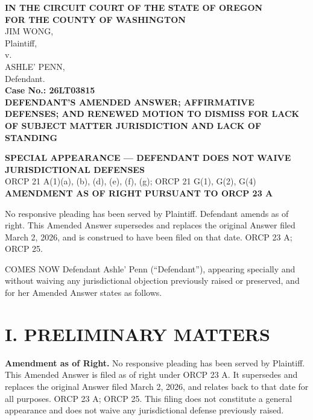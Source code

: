 \documentclass[12pt,letterpaper]{article}
\newcommand{\docshortname}{AMENDED ANSWER}
\newcommand{\oregoncaption}[5]{%
\noindent
\textbf{IN THE CIRCUIT COURT OF THE STATE OF OREGON} \\
\textbf{FOR THE COUNTY OF #1} \\
\vspace{0.2in}
\noindent #2, \\
\quad Plaintiff, \\
v. \\
#3, \\
\quad Defendant. \\
\vspace{0.1in}
\noindent \textbf{Case No.: #4} \\
\vspace{0.1in}
\noindent \textbf{#5} \\
\vspace{0.1in}
}
\begin{document}
\renewcommand{\docshortname}{AMENDED ANSWER}

\oregoncaption{WASHINGTON}{JIM WONG}{ASHLE' PENN}{26LT03815}{DEFENDANT'S AMENDED ANSWER; AFFIRMATIVE DEFENSES; AND RENEWED MOTION TO DISMISS FOR LACK OF SUBJECT MATTER JURISDICTION AND LACK OF STANDING}

\begin{center}
\textbf{SPECIAL APPEARANCE --- DEFENDANT DOES NOT WAIVE JURISDICTIONAL DEFENSES} \\
ORCP 21 A(1)(a), (b), (d), (e), (f), (g); ORCP 21 G(1), G(2), G(4) \\
\textbf{AMENDMENT AS OF RIGHT PURSUANT TO ORCP 23 A}
\end{center}

No responsive pleading has been served by Plaintiff. Defendant amends as of right. This Amended Answer supersedes and replaces the original Answer filed March 2, 2026, and is construed to have been filed on that date. ORCP 23 A; ORCP 25.

COMES NOW Defendant Ashle' Penn (``Defendant''), appearing specially and without waiving any jurisdictional objection previously raised or preserved, and for her Amended Answer states as follows.

\section*{I. PRELIMINARY MATTERS}

\textbf{Amendment as of Right.} No responsive pleading has been served by Plaintiff. This Amended Answer is filed as of right under ORCP 23 A. It supersedes and replaces the original Answer filed March 2, 2026, and relates back to that date for all purposes. ORCP 23 A; ORCP 25. This filing does not constitute a general appearance and does not waive any jurisdictional defense previously raised.
\end{document}
